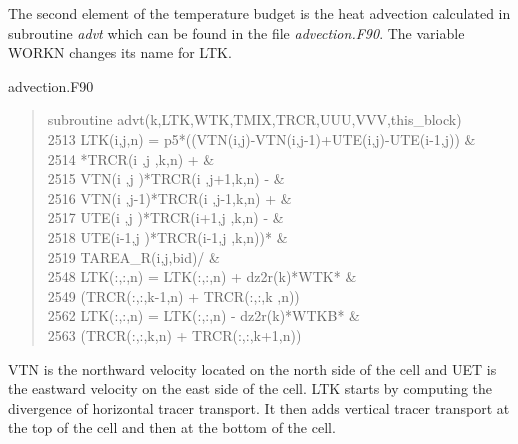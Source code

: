 The second element of the temperature budget is the heat advection calculated in subroutine \textit{advt} which can be found in the file \textit{advection.F90}. The variable WORKN changes its name for LTK. 
\begin{samepage}
\begin{center} advection.F90 \end{center}
\begin{quotation}
\small
\linespread{0.5}\selectfont{} \hspace{1em} subroutine advt(k,LTK,WTK,TMIX,TRCR,UUU,VVV,this\_block)\\
2513 	\hspace{1em} LTK(i,j,n) = p5*((VTN(i,j)-VTN(i,j-1)+UTE(i,j)-UTE(i-1,j))  \&\\
2514 	\hspace{1em} *TRCR(i  ,j  ,k,n) +           \&\\
2515 	\hspace{1em} VTN(i  ,j  )*TRCR(i  ,j+1,k,n) -           \&\\
2516 	\hspace{1em} VTN(i  ,j-1)*TRCR(i  ,j-1,k,n) +           \&\\
2517 	\hspace{1em} UTE(i  ,j  )*TRCR(i+1,j  ,k,n) -           \&\\
2518 	\hspace{1em} UTE(i-1,j  )*TRCR(i-1,j  ,k,n))*           \&\\
2519 	\hspace{1em} TAREA\_R(i,j,bid)/ \& \\
2548 	\hspace{1em} LTK(:,:,n) = LTK(:,:,n) + dz2r(k)*WTK*  \&\\
2549 	\hspace{1em}  (TRCR(:,:,k-1,n) + TRCR(:,:,k  ,n))\\
2562		\hspace{1em}          LTK(:,:,n) = LTK(:,:,n) - dz2r(k)*WTKB* \&\\
2563 	\hspace{1em}                         (TRCR(:,:,k,n) + TRCR(:,:,k+1,n))
\end{quotation}
\end{samepage}
VTN is the northward velocity located on the north side of the cell and UET is the eastward velocity on the east side of the cell. LTK starts by computing the divergence of horizontal tracer transport. It then adds vertical tracer transport at the top of the cell and then at the bottom of the cell. 

